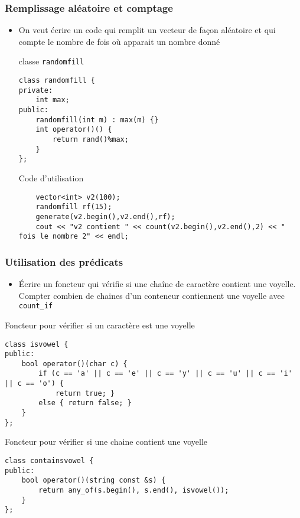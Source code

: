 \begin{frame}[fragile]\frametitle{Remplissage aléatoire et comptage}
\begin{itemize}
\item On veut écrire un code qui remplit un vecteur de façon aléatoire et qui compte le nombre de fois où apparait un nombre donné
\pause\begin{codeblock}{classe \texttt{randomfill}}
\begin{lstlisting}
class randomfill {
private:
    int max;
public:
    randomfill(int m) : max(m) {}
    int operator()() {
        return rand()%max;
    }
};
\end{lstlisting}
\end{codeblock}
\pause\begin{codeblock}{Code d'utilisation}
\begin{lstlisting}
    vector<int> v2(100);
    randomfill rf(15);
    generate(v2.begin(),v2.end(),rf);
    cout << "v2 contient " << count(v2.begin(),v2.end(),2) << " fois le nombre 2" << endl;
\end{lstlisting}
\end{codeblock}
\end{itemize}
\end{frame}

\begin{frame}[fragile]\frametitle{Utilisation des prédicats}
\begin{itemize}
\item Écrire un foncteur qui vérifie si une chaîne de caractère contient une voyelle. Compter combien de chaines d'un conteneur contiennent une voyelle avec  \verb|count_if| 
\end{itemize}
\pause\begin{codeblock}{Foncteur pour vérifier si un caractère est une voyelle}
\begin{lstlisting}
class isvowel {
public:
    bool operator()(char c) {
        if (c == 'a' || c == 'e' || c == 'y' || c == 'u' || c == 'i' || c == 'o') {
            return true; }
        else { return false; }
    }
};
\end{lstlisting}
\end{codeblock}
\pause\begin{codeblock}{Foncteur pour vérifier si une chaine contient une voyelle}
\begin{lstlisting}
class containsvowel {
public:
    bool operator()(string const &s) {
        return any_of(s.begin(), s.end(), isvowel());
    }
};
\end{lstlisting}
\end{codeblock}

\end{frame}

